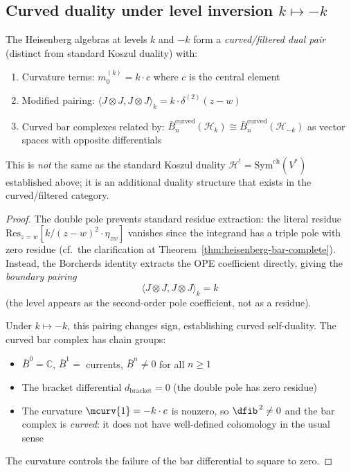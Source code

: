 \subsection{\texorpdfstring{Curved duality under level inversion $k \mapsto -k$}{Curved duality under level inversion k -k}}

\begin{theorem}\label{thm:heisenberg-level-inversion}
The Heisenberg algebras at levels $k$ and $-k$ form a \emph{curved/filtered dual pair} (distinct from standard Koszul duality) with:
\begin{enumerate}
\item Curvature terms: $m_0^{(k)} = k \cdot c$ where $c$ is the central element
\item Modified pairing: $\langle J \otimes J, J \otimes J \rangle_k = k \cdot \delta^{(2)}(z-w)$
\item Curved bar complexes related by: $\bar{B}^{\text{curved}}_n(\mathcal{H}_k) \cong \bar{B}^{\text{curved}}_n(\mathcal{H}_{-k})$ as vector spaces with opposite differentials
\end{enumerate}

This is \emph{not} the same as the standard Koszul duality $\mathcal{H}^! = \mathrm{Sym}^{\mathrm{ch}}(V^*)$ established above; it is an additional duality structure that exists in the curved/filtered category.
\end{theorem}

\begin{proof}
The double pole prevents standard residue extraction: the literal residue $\mathrm{Res}_{z=w}[k/(z-w)^2 \cdot \eta_{zw}]$ vanishes since the integrand has a triple pole with zero residue (cf.\ the clarification at Theorem~\ref{thm:heisenberg-bar-complete}).  Instead, the Borcherds identity extracts the OPE coefficient directly, giving the \emph{boundary pairing}
\[
\langle J \otimes J, J \otimes J \rangle_k = k
\]
(the level appears as the second-order pole coefficient, not as a residue).

Under $k \mapsto -k$, this pairing changes sign, establishing curved self-duality.  The curved bar complex has chain groups:
\begin{itemize}
\item $\bar{B}^0 = \mathbb{C}$, \quad $\bar{B}^1 = $ currents, \quad $\bar{B}^n \neq 0$ for all $n \geq 1$
\item The bracket differential $d_{\mathrm{bracket}} = 0$ (the double pole has zero residue)
\item The curvature $\mcurv{1} = -k \cdot c$ is nonzero, so $\dfib^{\,2} \neq 0$ and the bar complex is \emph{curved}: it does not have well-defined cohomology in the usual sense
\end{itemize}
The curvature controls the failure of the bar differential to square to zero.
\end{proof}


